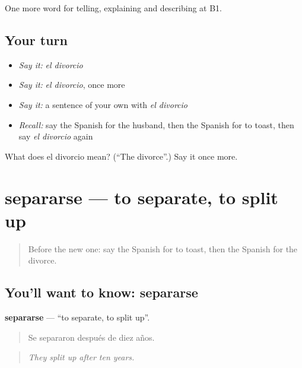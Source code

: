 \begin{grammarlens}[title={What you've built}]
One more word for telling, explaining and describing at B1.
\end{grammarlens}

\subsection*{Your turn}
\begin{itemize}
\raggedright
  \item \emph{Say it:} \emph{el divorcio}
  \item \emph{Say it:} \emph{el divorcio}, once more
  \item \emph{Say it:} a sentence of your own with \emph{el divorcio}
  \item \emph{Recall:} say the Spanish for the husband, then the Spanish for to toast, then say \emph{el divorcio} again
\end{itemize}

\begin{tcolorbox}[breakable,colback=teal!4,colframe=teal!35!black,title={Before you move on}]
What does el divorcio mean? (\textquotedblleft{}The divorce\textquotedblright{}.) Say it once more.
\end{tcolorbox}
\section[separarse]{separarse — to separate, to split up}

\label{lesson:ES-C550-separarse}



\begin{quote}
Before the new one: say the Spanish for to toast, then the Spanish for the divorce.
\end{quote}

\subsection*{You'll want to know: separarse}
\textbf{separarse} — \textquotedblleft{}to separate, to split up\textquotedblright{}.

\begin{quote}
Se separaron después de diez años.
\end{quote}

\begin{quote}
\emph{They split up after ten years.}
\end{quote}

